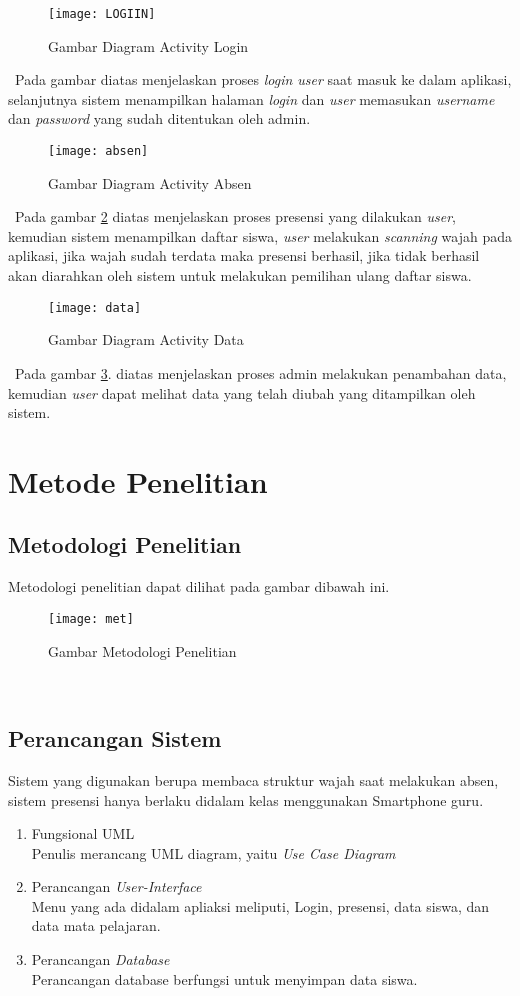 \begin{figure}[h]
\centering
\texttt{[image: LOGIIN]}
\caption{Gambar Diagram Activity Login}
\label{lab:login}
\end{figure}\
Pada gambar diatas menjelaskan proses \emph{login user} saat masuk ke dalam aplikasi, selanjutnya sistem menampilkan halaman \emph{login} dan \emph{user} memasukan \emph{username} dan \emph{password} yang sudah ditentukan oleh admin.
\newpage

\begin{figure}[h]
\centering
\texttt{[image: absen]}
\caption{Gambar Diagram Activity Absen}
\label{lab:absen}
\end{figure}\
Pada gambar \ref{lab:absen} diatas menjelaskan proses presensi yang dilakukan \emph{user}, kemudian sistem menampilkan daftar siswa, \emph{user} melakukan \emph{scanning} wajah pada aplikasi, jika wajah sudah terdata maka presensi berhasil, jika tidak berhasil akan diarahkan oleh sistem untuk melakukan pemilihan ulang daftar siswa.
\newpage

\begin{figure}[h]
\centering
\texttt{[image: data]}
\caption{Gambar Diagram Activity Data}
\label{lab:data}
\end{figure}\
Pada gambar \ref{lab:data}. diatas menjelaskan proses admin melakukan penambahan data, kemudian \emph{user} dapat melihat data yang telah diubah yang ditampilkan oleh sistem.
\newpage

\section{Metode Penelitian}
\subsection{Metodologi Penelitian}
Metodologi penelitian dapat dilihat pada gambar dibawah ini.
\begin{figure}[h]
\centering
\texttt{[image: met]}
\caption{Gambar Metodologi Penelitian}
\label{lab:met}
\end{figure}\
\newpage

\subsection{Perancangan Sistem}
Sistem yang digunakan berupa membaca struktur wajah saat melakukan absen, sistem presensi hanya berlaku didalam kelas menggunakan Smartphone guru.
\begin{enumerate}
\item Fungsional UML\\
Penulis merancang UML diagram, yaitu \emph{Use Case Diagram}
\item Perancangan \emph{User-Interface}\\
Menu yang ada didalam apliaksi meliputi, Login, presensi, data siswa, dan data mata pelajaran.
\item Perancangan \emph{Database}\\
Perancangan database berfungsi untuk menyimpan data siswa.
\end{enumerate} 

